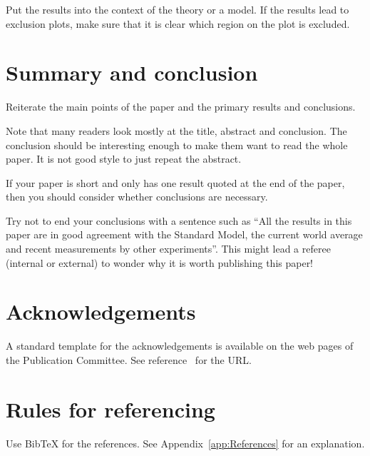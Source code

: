\documentclass[11pt,a4paper]{cepcnote}
\newcommand{\BibTeX}{{\sc Bib\TeX}}
\begin{document}
Put the results into the context of the theory or a model.
%
If the results lead to exclusion plots, make sure that it is clear 
which region on the plot is excluded.

%
%
\section{Summary and conclusion}

Reiterate the main points of the paper and the primary results and
conclusions.

Note that many readers look mostly at the title, abstract and
conclusion. The conclusion should be interesting enough to
make them want to read the whole paper.
It is not good style to just repeat the abstract.

If your paper is short and only has one result quoted at the end of
the paper, then you should consider whether conclusions are
necessary. 

Try not to end your conclusions with a sentence such as
``All the results in this paper are in good agreement with the
Standard Model, the current world average and recent
measurements by other experiments''. This might lead a referee
(internal or external) to wonder why it is worth publishing this
paper!

%
%
\section{Acknowledgements}

A standard template for the acknowledgements is available on the
web pages of the Publication Committee.
See reference~\cite{publication_policy} for the URL. 

%
%
\section{Rules for referencing}

Use \BibTeX{} for the references. See Appendix~\ref{app:References}
for an explanation.
\end{document}
